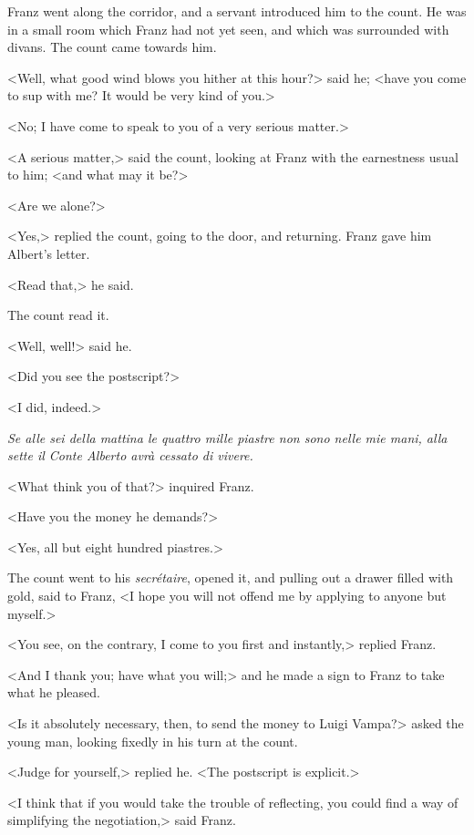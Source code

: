  Franz went along the corridor, and a servant introduced him to the count. He was in a small room which Franz had not yet seen, and which was surrounded with divans. The count came towards him. 

 <Well, what good wind blows you hither at this hour?> said he; <have you come to sup with me? It would be very kind of you.> 

 <No; I have come to speak to you of a very serious matter.> 

 <A serious matter,> said the count, looking at Franz with the earnestness usual to him; <and what may it be?> 

 <Are we alone?> 

 <Yes,> replied the count, going to the door, and returning. Franz gave him Albert's letter. 

 <Read that,> he said. 

 The count read it. 

 <Well, well!> said he. 

 <Did you see the postscript?> 

<I did, indeed.>

\begin{mail}{}{}
 \textit{Se alle sei della mattina le quattro mille piastre non sono nelle mie mani, alla sette il Conte Alberto avrà cessato di vivere.}

\end{mail}

 <What think you of that?> inquired Franz. 

 <Have you the money he demands?> 

 <Yes, all but eight hundred piastres.> 

 The count went to his \textit{secrétaire}, opened it, and pulling out a drawer filled with gold, said to Franz, <I hope you will not offend me by applying to anyone but myself.> 

 <You see, on the contrary, I come to you first and instantly,> replied Franz. 

 <And I thank you; have what you will;> and he made a sign to Franz to take what he pleased. 

 <Is it absolutely necessary, then, to send the money to Luigi Vampa?> asked the young man, looking fixedly in his turn at the count. 

 <Judge for yourself,> replied he. <The postscript is explicit.> 

 <I think that if you would take the trouble of reflecting, you could find a way of simplifying the negotiation,> said Franz. 

